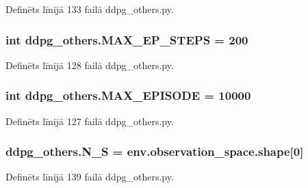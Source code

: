 Definēts līnijā 133 failā ddpg\+\_\+others.\+py.

\subsubsection[{\texorpdfstring{M\+A\+X\+\_\+\+E\+P\+\_\+\+S\+T\+E\+PS}{MAX_EP_STEPS}}]{\setlength{\rightskip}{0pt plus 5cm}int ddpg\+\_\+others.\+M\+A\+X\+\_\+\+E\+P\+\_\+\+S\+T\+E\+PS = 200}\hypertarget{namespaceddpg__others_a0db47bb3ba4a2b08dfae7438342b3ef1}{}\label{namespaceddpg__others_a0db47bb3ba4a2b08dfae7438342b3ef1}


Definēts līnijā 128 failā ddpg\+\_\+others.\+py.

\subsubsection[{\texorpdfstring{M\+A\+X\+\_\+\+E\+P\+I\+S\+O\+DE}{MAX_EPISODE}}]{\setlength{\rightskip}{0pt plus 5cm}int ddpg\+\_\+others.\+M\+A\+X\+\_\+\+E\+P\+I\+S\+O\+DE = 10000}\hypertarget{namespaceddpg__others_afb464b6fe0768d57caf65334b4d8f87e}{}\label{namespaceddpg__others_afb464b6fe0768d57caf65334b4d8f87e}


Definēts līnijā 127 failā ddpg\+\_\+others.\+py.

\subsubsection[{\texorpdfstring{N\+\_\+S}{N_S}}]{\setlength{\rightskip}{0pt plus 5cm}ddpg\+\_\+others.\+N\+\_\+S = env.\+observation\+\_\+space.\+shape\mbox{[}0\mbox{]}}\hypertarget{namespaceddpg__others_a085e3af0235a4184f14e45c40242542c}{}\label{namespaceddpg__others_a085e3af0235a4184f14e45c40242542c}


Definēts līnijā 139 failā ddpg\+\_\+others.\+py.

